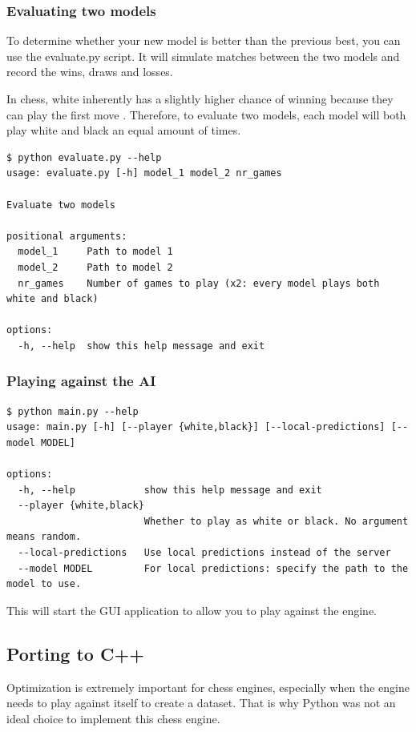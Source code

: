 \documentclass{article}
\begin{document}
\subsubsection{Evaluating two models}

To determine whether your new model is better than the previous best, you can use the evaluate.py script.
It will simulate matches between the two models and record the wins, draws and losses.

In chess, white inherently has a slightly higher chance of winning because they can play the first move \cite{FirstmoveAdvantageChess2022}.
Therefore, to evaluate two models, each model will both play white and black an equal amount of times.

\begin{verbatim}
$ python evaluate.py --help
usage: evaluate.py [-h] model_1 model_2 nr_games

Evaluate two models

positional arguments:
  model_1     Path to model 1
  model_2     Path to model 2
  nr_games    Number of games to play (x2: every model plays both white and black)

options:
  -h, --help  show this help message and exit
\end{verbatim}

\subsubsection{Playing against the AI}

\begin{verbatim}
$ python main.py --help
usage: main.py [-h] [--player {white,black}] [--local-predictions] [--model MODEL]

options:
  -h, --help            show this help message and exit
  --player {white,black}
                        Whether to play as white or black. No argument means random.
  --local-predictions   Use local predictions instead of the server
  --model MODEL         For local predictions: specify the path to the model to use.
\end{verbatim}

This will start the GUI application to allow you to play against the engine. 

\subsection{Porting to C++}

Optimization is extremely important for chess engines, especially when the engine needs to play
against itself to create a dataset. That is why Python was not an ideal choice to implement this chess engine.
\end{document}
